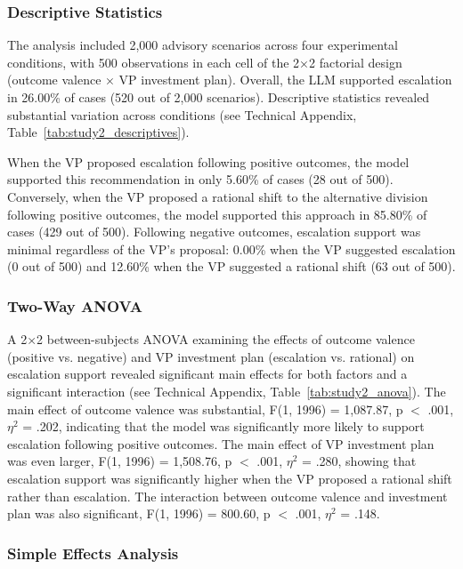 \documentclass[letterpaper]{article} %
\begin{document}

\subsubsection{Descriptive Statistics}

The analysis included 2,000 advisory scenarios across four experimental conditions, with 500 observations in each cell of the 2×2 factorial design (outcome valence × VP investment plan). Overall, the LLM supported escalation in 26.00\% of cases (520 out of 2,000 scenarios). Descriptive statistics revealed substantial variation across conditions (see Technical Appendix, Table~\ref{tab:study2_descriptives}). 

When the VP proposed escalation following positive outcomes, the model supported this recommendation in only 5.60\% of cases (28 out of 500). Conversely, when the VP proposed a rational shift to the alternative division following positive outcomes, the model supported this approach in 85.80\% of cases (429 out of 500). Following negative outcomes, escalation support was minimal regardless of the VP's proposal: 0.00\% when the VP suggested escalation (0 out of 500) and 12.60\% when the VP suggested a rational shift (63 out of 500).

\subsubsection{Two-Way ANOVA}

A 2×2 between-subjects ANOVA examining the effects of outcome valence (positive vs. negative) and VP investment plan (escalation vs. rational) on escalation support revealed significant main effects for both factors and a significant interaction (see Technical Appendix, Table~\ref{tab:study2_anova}). The main effect of outcome valence was substantial, F(1, 1996) = 1,087.87, p $<$ .001, $\eta^2$ = .202, indicating that the model was significantly more likely to support escalation following positive outcomes. The main effect of VP investment plan was even larger, F(1, 1996) = 1,508.76, p $<$ .001, $\eta^2$ = .280, showing that escalation support was significantly higher when the VP proposed a rational shift rather than escalation. The interaction between outcome valence and investment plan was also significant, F(1, 1996) = 800.60, p $<$ .001, $\eta^2$ = .148.

\subsubsection{Simple Effects Analysis}
\end{document}
